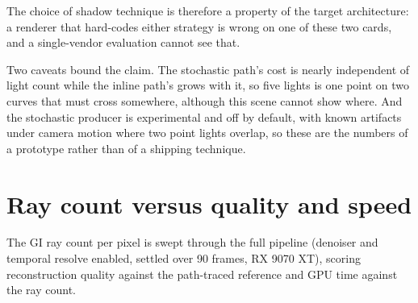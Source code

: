 The choice of shadow technique is therefore a property of the target architecture: a renderer that
hard-codes either strategy is wrong on one of these two cards, and a single-vendor evaluation cannot
see that.

Two caveats bound the claim. The stochastic path's cost is nearly independent of light count while the
inline path's grows with it, so five lights is one point on two curves that must cross somewhere,
although this scene cannot show where. And the stochastic producer is experimental and off by default, with known
artifacts under camera motion where two point lights overlap, so these are the numbers of a prototype
rather than of a shipping technique.

\section{Ray count versus quality and speed}
\label{sec:raycount}

The GI ray count per pixel is swept through the full pipeline (denoiser and temporal resolve enabled,
settled over 90 frames, RX 9070 XT), scoring reconstruction quality against the path-traced reference
and GPU time against the ray count.

\begin{table}[htb]
\centering
\caption[GI quality and GPU cost against rays per pixel]{GI quality and GPU cost as a function of
rays per pixel (denoiser and temporal resolve enabled, RX 9070 XT). The GPU total is a GI-only
configuration with the other three effects disabled, so it is a smaller frame than the
\texttt{+gi} total of Table~\ref{tab:cena}: the same absolute increase is \rcGpuPct\% of this
frame and roughly a third of the full four-effect one.}
\label{tab:raycount}

\end{table}

